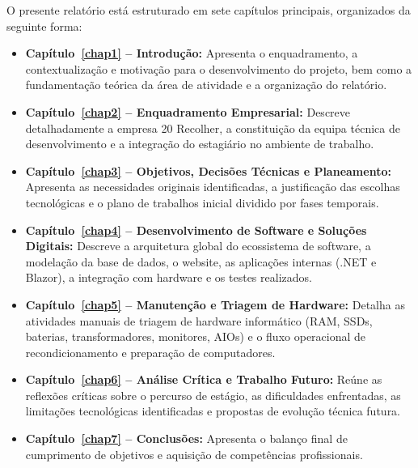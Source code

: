 O presente relatório está estruturado em sete capítulos principais, organizados da seguinte forma:
\begin{itemize}
    \item \textbf{Capítulo~\ref{chap1} -- Introdução:} Apresenta o enquadramento, a contextualização e motivação para o desenvolvimento do projeto, bem como a fundamentação teórica da área de atividade e a organização do relatório.
    \item \textbf{Capítulo~\ref{chap2} -- Enquadramento Empresarial:} Descreve detalhadamente a empresa 20 Recolher, a constituição da equipa técnica de desenvolvimento e a integração do estagiário no ambiente de trabalho.
    \item \textbf{Capítulo~\ref{chap3} -- Objetivos, Decisões Técnicas e Planeamento:} Apresenta as necessidades originais identificadas, a justificação das escolhas tecnológicas e o plano de trabalhos inicial dividido por fases temporais.
    \item \textbf{Capítulo~\ref{chap4} -- Desenvolvimento de Software e Soluções Digitais:} Descreve a arquitetura global do ecossistema de software, a modelação da base de dados, o website, as aplicações internas (.NET e Blazor), a integração com hardware e os testes realizados.
    \item \textbf{Capítulo~\ref{chap5} -- Manutenção e Triagem de Hardware:} Detalha as atividades manuais de triagem de hardware informático (RAM, SSDs, baterias, transformadores, monitores, AIOs) e o fluxo operacional de recondicionamento e preparação de computadores.
    \item \textbf{Capítulo~\ref{chap6} -- Análise Crítica e Trabalho Futuro:} Reúne as reflexões críticas sobre o percurso de estágio, as dificuldades enfrentadas, as limitações tecnológicas identificadas e propostas de evolução técnica futura.
    \item \textbf{Capítulo~\ref{chap7} -- Conclusões:} Apresenta o balanço final de cumprimento de objetivos e aquisição de competências profissionais.
\end{itemize}
